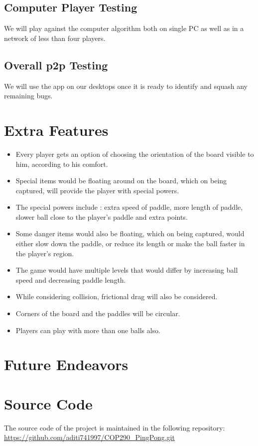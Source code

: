 \documentclass{article}
\begin{document}
			\subsection{Computer Player Testing}
			We will play against the computer algorithm both on single PC as well as in a network of less than four players.
			\subsection{Overall p2p Testing}
				We will use the app on our desktops once it is ready to identify and squash any remaining bugs.
	\section{Extra Features}
	\begin{itemize}
	\item Every player gets an option of choosing the orientation of the board visible to him, according to his comfort.
	\item Special items would be floating around on the board, which on being captured, will provide the player with special powers.
	\item The special powers include : extra speed of paddle, more length of paddle, slower ball close to the player's paddle and extra points.
	\item Some danger items would also be floating, which on being captured, would either slow down the paddle, or reduce its length or make the ball faster in the player's region.
	\item The game would have multiple levels that would differ by increasing ball speed and decreasing paddle length.
	\item While considering collision, frictional drag will also be considered.
	\item Corners of the board and the paddles will be circular.
	\item Players can play with more than one balls also.
	\end{itemize}

	\section{Future Endeavors}

	\section{Source Code}
	The source code of the project is maintained in the following repository: \\
	\url{https://github.com/aditi741997/COP290_PingPong.git}
	
	\medskip
	
\end{document}
